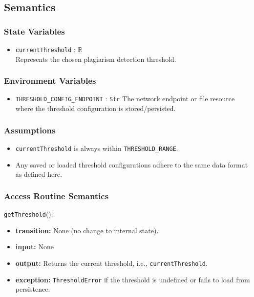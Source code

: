 \documentclass[12pt, titlepage]{article}
\begin{document}
\subsection{Semantics}

\subsubsection{State Variables}

\begin{itemize}
    \item \texttt{currentThreshold} : $\mathbb{R}$ \\
     Represents the chosen plagiarism detection threshold.
\end{itemize}

\subsubsection{Environment Variables}

\begin{itemize}
    \item \texttt{THRESHOLD\_CONFIG\_ENDPOINT} : \texttt{Str} The network endpoint or file resource where the threshold configuration is stored/persisted.
\end{itemize}

\subsubsection{Assumptions}

\begin{itemize}
    \item \texttt{currentThreshold} is always within \texttt{THRESHOLD\_RANGE}.
    \item Any saved or loaded threshold configurations adhere to the same data format as defined here.
\end{itemize}

\subsubsection{Access Routine Semantics}

\noindent \texttt{getThreshold}():
\begin{itemize}
    \item \textbf{transition:} None (no change to internal state).
    \item \textbf{input:} None
    \item \textbf{output:} Returns the current threshold, i.e., \texttt{currentThreshold}.
    \item \textbf{exception:} \texttt{ThresholdError} if the threshold is undefined or fails to load from persistence.
\end{itemize}
\end{document}
